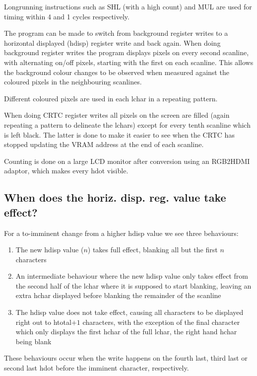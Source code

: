\documentclass[a4paper,10pt]{amsart}
\begin{document}
Longrunning instructions such as SHL (with a high count) and MUL are used for
timing within 4 and 1 cycles respectively.

The program can be made to switch from background register writes to a
horizontal displayed (hdisp) register write and back again. When doing
background register writes the program displays pixels on every second
scanline, with alternating on/off pixels, starting with the first on each
scanline. This allows the background colour changes to be observed when
measured against the coloured pixels in the neighbouring scanlines.

Different coloured pixels are used in each lchar in a repeating pattern.

When doing CRTC register writes all pixels on the screen are filled (again
repeating a pattern to delineate the lchars) except for every tenth scanline
which is left black. The latter is done to make it easier to see when the
CRTC has stopped updating the VRAM address at the end of each scanline.

Counting is done on a large LCD monitor after conversion using an RGB2HDMI
adaptor, which makes every hdot visible.

\subsection{When does the horiz. disp. reg. value take effect?}

For a to-imminent change from a higher hdisp value we see three behaviours:

\begin{enumerate}
\item The new hdisp value ($n$) takes full effect, blanking all but the
first $n$ characters
\item An intermediate behaviour where the new hdisp value only takes effect
from the second half of the lchar where it is supposed to start blanking, leaving
an extra hchar displayed before blanking the remainder of the scanline
\item The hdisp value does not take effect, causing all characters to be
displayed right out to htotal$+1$ characters, with the exception
of the final character which only displays the first hchar of the full lchar,
the right hand hchar being blank
\end{enumerate}

These behaviours occur when the write happens on the fourth last, third last or
second last hdot before the imminent character, respectively.
\end{document}
